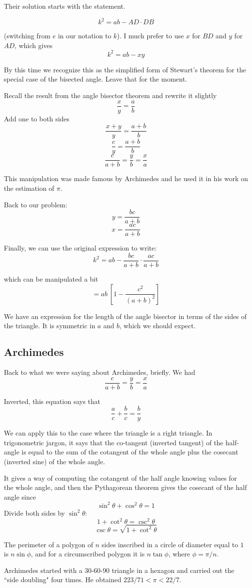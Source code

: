 \documentclass[11pt, oneside]{article}
\begin{document}
Their solution starts with the statement.

\[ k^2 = ab - AD \cdot DB \]

(switching from $e$ in our notation to $k$).  I much prefer to use $x$ for $BD$ and $y$ for $AD$, which gives
\[ k^2 = ab - xy \]

By this time we recognize this as the simplified form of Stewart's theorem for the special case of the bisected angle.  Leave that for the moment.  

Recall the result from the angle bisector theorem and rewrite it slightly
\[ \frac{x}{y} = \frac{a}{b} \]
Add one to both sides
\[ \frac{x + y}{y} = \frac{a + b}{b} \]
\[ \frac{c}{y} = \frac{a + b}{b} \]
\[ \frac{c}{a + b} = \frac{y}{b} = \frac{x}{a} \]

This manipulation was made famous by Archimedes and he used it in his work on the estimation of $\pi$.  

Back to our problem:
\[ y = \frac{bc}{a + b} \]
\[ x = \frac{ac}{a + b} \]

Finally, we can use the original expression to write:
\[ k^2 = ab -  \frac{bc}{a + b} \cdot \frac{ac}{a + b} \]

which can be manipulated a bit  
\[ = ab \ [1 - \frac{c^2}{(a + b)^2}] \]

We have an expression for the length of the angle bisector in terms of the sides of the triangle.  It is symmetric in $a$ and $b$, which we should expect.

\subsection*{Archimedes}

Back to what we were saying about Archimedes, briefly.  We had
\[ \frac{c}{a + b} = \frac{y}{b} = \frac{x}{a} \]

Inverted, this equation says that 
\[ \frac{a}{c} + \frac{b}{c} = \frac{b}{y} \]

We can apply this to the case where the triangle is a right triangle.  In trigonometric jargon, it says that the co-tangent (inverted tangent) of the half-angle is equal to the sum of the cotangent of the whole angle plus the cosecant (inverted sine) of the whole angle.

It gives a way of computing the cotangent of the half angle knowing values for the whole angle, and then the Pythagorean theorem gives the cosecant of the half angle since 
\[ \sin^2 \theta + \cos^2 \theta = 1 \]
Divide both sides by $\sin^2 \theta$:
\[ 1 + \cot^2 \theta = \csc^2 \theta \]
\[ \csc \theta = \sqrt{1 + \cot^2 \theta} \]

The perimeter of a polygon of $n$ sides inscribed in a circle of diameter equal to $1$ is $n \sin \phi$, and for a circumscribed polygon it is $n \tan \phi$, where $\phi = \pi/n$.

Archimedes started with a 30-60-90 triangle in a hexagon and carried out the ``side doubling" four times.  He obtained $223/71 < \pi < 22/7 $.
\end{document}
